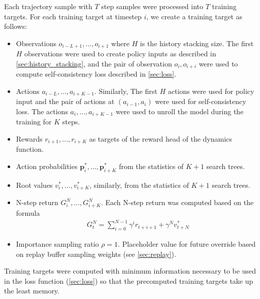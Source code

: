Each trajectory sample with $T$ step samples were processed into $T$ training targets.
For each training target at timestep $i$, we create a training target as follows:
\begin{itemize}
    \item Observations $o_{i - L + 1}, \dots, o_{i + 1}$ where $H$ is the history stacking size.
          The first $H$ observations were used to create policy inputs as described in \ref{sec:history_stacking},
          and the pair of observation $o_{i}, o_{i+i}$ were used to compute self-consistency loss described in \ref{sec:loss}.

    \item Actions $a_{i - L}, \dots, a_{i + K - 1}$.
          Similarly, The first $H$ actions were used for policy input and the pair of actions at $(a_{i - 1}, a_{i})$ were used for self-consistency loss.
          The actions $a_{i}, \dots, a_{i + K - 1}$ were used to unroll the model during the training for $K$ steps.

    \item Rewards $r_{i + 1}, \dots, r_{i + K}$ as targets of the reward head of the dynamics function.

    \item Action probabilities $\mathbf{p}^*_{i}, \dots, \mathbf{p}^*_{i + K}$ from the statistics of $K + 1$ search trees.

    \item Root values $v^*_i, \dots, v^*_{i + K}$, similarly, from the statistics of $K + 1$ search trees.

    \item N-step return $G^N_{i}, \dots, G^N_{i + K}$.
          Each N-step return was computed based on the formula
          \begin{align*}
              G^N_{t} = \sum_{i = 0}^{N - 1}{\gamma^i r_{t+i+1}} + \gamma^Nv^*_{t + N}
          \end{align*}

    \item Importance sampling ratio $\rho = 1$. Placeholder value for future override based on replay buffer sampling weights (see \ref{sec:replay}).
\end{itemize}
Training targets were computed with minimum information necessary to be used in the loss function (\ref{sec:loss}) so that the precomputed training targets take up the least memory.

